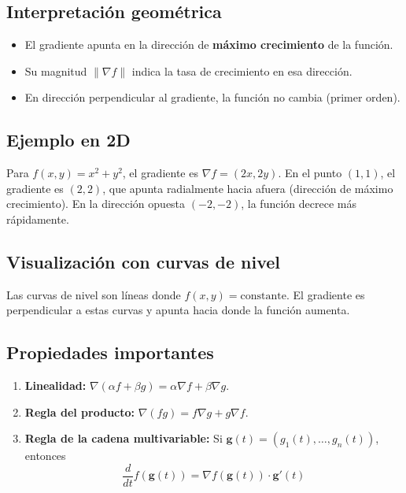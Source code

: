 \documentclass[12pt,a4paper,openany,oneside]{book}
\begin{document}
\subsection{Interpretación geométrica}
\begin{itemize}
    \item El gradiente apunta en la dirección de \textbf{máximo crecimiento} de la función.
    \item Su magnitud $\|\nabla f\|$ indica la tasa de crecimiento en esa dirección.
    \item En dirección perpendicular al gradiente, la función no cambia (primer orden).
\end{itemize}

\subsection{Ejemplo en 2D}
Para $f(x, y) = x^2 + y^2$, el gradiente es $\nabla f = (2x, 2y)$. En el punto $(1,1)$, el gradiente es $(2,2)$, que apunta radialmente hacia afuera (dirección de máximo crecimiento). En la dirección opuesta $(-2,-2)$, la función decrece más rápidamente.

\subsection{Visualización con curvas de nivel}
Las curvas de nivel son líneas donde $f(x,y) = \text{constante}$. El gradiente es perpendicular a estas curvas y apunta hacia donde la función aumenta.

\begin{center}
\end{center}

\subsection{Propiedades importantes}
\begin{enumerate}
    \item \textbf{Linealidad:} $\nabla (\alpha f + \beta g) = \alpha \nabla f + \beta \nabla g$.
    \item \textbf{Regla del producto:} $\nabla (f g) = f \nabla g + g \nabla f$.
    \item \textbf{Regla de la cadena multivariable:} Si $\mathbf{g}(t) = (g_1(t), \dots, g_n(t))$, entonces
    \[
    \frac{d}{dt} f(\mathbf{g}(t)) = \nabla f(\mathbf{g}(t)) \cdot \mathbf{g}'(t)
    \]
\end{enumerate}
\end{document}
